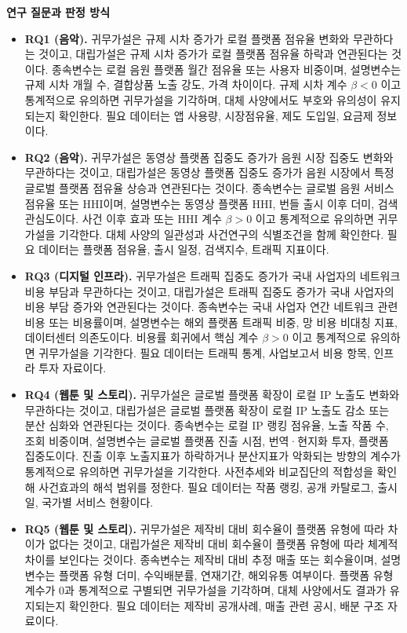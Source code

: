 \documentclass[11pt,a4paper]{report}
\begin{document}
\noindent\textbf{연구 질문과 판정 방식}
\begin{itemize}[leftmargin=*, itemsep=0.6em]
  \item \textbf{RQ1 (음악).} 귀무가설은 규제 시차 증가가 로컬 플랫폼 점유율 변화와 무관하다는 것이고, 대립가설은 규제 시차 증가가 로컬 플랫폼 점유율 하락과 연관된다는 것이다. 종속변수는 로컬 음원 플랫폼 월간 점유율 또는 사용자 비중이며, 설명변수는 규제 시차 개월 수, 결합상품 노출 강도, 가격 차이이다. 규제 시차 계수 $\beta < 0$ 이고 통계적으로 유의하면 귀무가설을 기각하며, 대체 사양에서도 부호와 유의성이 유지되는지 확인한다. 필요 데이터는 앱 사용량, 시장점유율, 제도 도입일, 요금제 정보이다.
  \item \textbf{RQ2 (음악).} 귀무가설은 동영상 플랫폼 집중도 증가가 음원 시장 집중도 변화와 무관하다는 것이고, 대립가설은 동영상 플랫폼 집중도 증가가 음원 시장에서 특정 글로벌 플랫폼 점유율 상승과 연관된다는 것이다. 종속변수는 글로벌 음원 서비스 점유율 또는 HHI이며, 설명변수는 동영상 플랫폼 HHI, 번들 출시 이후 더미, 검색 관심도이다. 사건 이후 효과 또는 HHI 계수 $\beta > 0$ 이고 통계적으로 유의하면 귀무가설을 기각한다. 대체 사양의 일관성과 사건연구의 식별조건을 함께 확인한다. 필요 데이터는 플랫폼 점유율, 출시 일정, 검색지수, 트래픽 지표이다.
  \item \textbf{RQ3 (디지털 인프라).} 귀무가설은 트래픽 집중도 증가가 국내 사업자의 네트워크 비용 부담과 무관하다는 것이고, 대립가설은 트래픽 집중도 증가가 국내 사업자의 비용 부담 증가와 연관된다는 것이다. 종속변수는 국내 사업자 연간 네트워크 관련 비용 또는 비용률이며, 설명변수는 해외 플랫폼 트래픽 비중, 망 비용 비대칭 지표, 데이터센터 의존도이다. 비용률 회귀에서 핵심 계수 $\beta > 0$ 이고 통계적으로 유의하면 귀무가설을 기각한다. 필요 데이터는 트래픽 통계, 사업보고서 비용 항목, 인프라 투자 자료이다.
  \item \textbf{RQ4 (웹툰 및 스토리).} 귀무가설은 글로벌 플랫폼 확장이 로컬 IP 노출도 변화와 무관하다는 것이고, 대립가설은 글로벌 플랫폼 확장이 로컬 IP 노출도 감소 또는 분산 심화와 연관된다는 것이다. 종속변수는 로컬 IP 랭킹 점유율, 노출 작품 수, 조회 비중이며, 설명변수는 글로벌 플랫폼 진출 시점, 번역·현지화 투자, 플랫폼 집중도이다. 진출 이후 노출지표가 하락하거나 분산지표가 악화되는 방향의 계수가 통계적으로 유의하면 귀무가설을 기각한다. 사전추세와 비교집단의 적합성을 확인해 사건효과의 해석 범위를 정한다. 필요 데이터는 작품 랭킹, 공개 카탈로그, 출시일, 국가별 서비스 현황이다.
  \item \textbf{RQ5 (웹툰 및 스토리).} 귀무가설은 제작비 대비 회수율이 플랫폼 유형에 따라 차이가 없다는 것이고, 대립가설은 제작비 대비 회수율이 플랫폼 유형에 따라 체계적 차이를 보인다는 것이다. 종속변수는 제작비 대비 추정 매출 또는 회수율이며, 설명변수는 플랫폼 유형 더미, 수익배분률, 연재기간, 해외유통 여부이다. 플랫폼 유형 계수가 0과 통계적으로 구별되면 귀무가설을 기각하며, 대체 사양에서도 결과가 유지되는지 확인한다. 필요 데이터는 제작비 공개사례, 매출 관련 공시, 배분 구조 자료이다.

\end{itemize}
\end{document}
